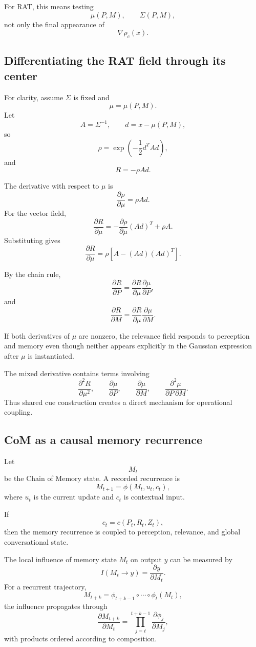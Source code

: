 \documentclass[11pt]{article}
\theoremstyle{definition}
\begin{document}
For RAT, this means testing
\[
\mu(P,M),
\qquad
\Sigma(P,M),
\]
not only the final appearance of
\[
\nabla\rho_c(x).
\]

\subsection{Differentiating the RAT field through its center}

For clarity, assume \(\Sigma\) is fixed and
\[
\mu=\mu(P,M).
\]
Let
\[
A=\Sigma^{-1},
\qquad
d=x-\mu(P,M),
\]
so
\[
\rho=\exp\left(-\frac12d^TAd\right),
\]
and
\[
R=-\rho Ad.
\]

The derivative with respect to \(\mu\) is
\[
\frac{\partial\rho}{\partial\mu}
=
\rho Ad.
\]
For the vector field,
\[
\frac{\partial R}{\partial\mu}
=
-\frac{\partial\rho}{\partial\mu}(Ad)^T
+
\rho A.
\]
Substituting gives
\[
\frac{\partial R}{\partial\mu}
=
\rho
\left[
A-(Ad)(Ad)^T
\right].
\]

By the chain rule,
\[
\frac{\partial R}{\partial P}
=
\frac{\partial R}{\partial\mu}
\frac{\partial\mu}{\partial P},
\]
and
\[
\frac{\partial R}{\partial M}
=
\frac{\partial R}{\partial\mu}
\frac{\partial\mu}{\partial M}.
\]

If both derivatives of \(\mu\) are nonzero, the relevance field responds to perception and memory even though neither appears explicitly in the Gaussian expression after \(\mu\) is instantiated.

The mixed derivative contains terms involving
\[
\frac{\partial^2R}{\partial\mu^2},
\qquad
\frac{\partial\mu}{\partial P},
\qquad
\frac{\partial\mu}{\partial M},
\qquad
\frac{\partial^2\mu}{\partial P\,\partial M}.
\]
Thus shared cue construction creates a direct mechanism for operational coupling.

\subsection{CoM as a causal memory recurrence}

Let
\[
M_t
\]
be the Chain of Memory state. A recorded recurrence is
\[
M_{t+1}
=
\phi(M_t,u_t,c_t),
\]
where \(u_t\) is the current update and \(c_t\) is contextual input.

If
\[
c_t
=
c(P_t,R_t,Z_t),
\]
then the memory recurrence is coupled to perception, relevance, and global conversational state.

The local influence of memory state \(M_t\) on output \(y\) can be measured by
\[
I(M_t\to y)
=
\frac{\partial y}{\partial M_t}.
\]
For a recurrent trajectory,
\[
M_{t+k}
=
\phi_{t+k-1}\circ\cdots\circ\phi_t(M_t),
\]
the influence propagates through
\[
\frac{\partial M_{t+k}}{\partial M_t}
=
\prod_{j=t}^{t+k-1}
\frac{\partial\phi_j}{\partial M_j},
\]
with products ordered according to composition.
\end{document}
